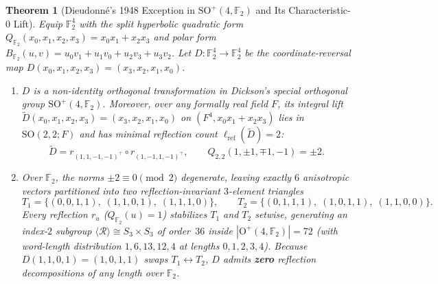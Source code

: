 \documentclass[11pt,a4paper]{article}
\theoremstyle{plain}
\newtheorem{theorem}{Theorem}[section]
\theoremstyle{definition}
\newcommand{\F}{\mathbb{F}}
\newcommand{\Orth}{\mathrm{O}}
\newcommand{\SO}{\mathrm{SO}}
\newcommand{\Refl}{\mathcal{R}}
\newcommand{\lref}{\ell_{\mathrm{ref}}}
\begin{document}
\begin{theorem}[Dieudonn\'e's 1948 Exception in $\SO^+(4, \F_2)$ and Its Characteristic-$0$ Lift]
\label{thm:dieudonne}
Equip $\F_2^4$ with the split hyperbolic quadratic form $Q_{\F_2}(x_0, x_1, x_2, x_3) = x_0 x_1 + x_2 x_3$ and polar form $B_{\F_2}(u, v) = u_0 v_1 + u_1 v_0 + u_2 v_3 + u_3 v_2$. Let $D : \F_2^4 \to \F_2^4$ be the coordinate-reversal map $D(x_0, x_1, x_2, x_3) = (x_3, x_2, x_1, x_0)$.
\begin{enumerate}
\item $D$ is a non-identity orthogonal transformation in Dickson's special orthogonal group $\SO^+(4, \F_2)$. Moreover, over any formally real field $F$, its integral lift $\widetilde{D}(x_0, x_1, x_2, x_3) = (x_3, x_2, x_1, x_0)$ on $(F^4, x_0 x_1 + x_2 x_3)$ lies in $\SO(2, 2; F)$ and has minimal reflection count $\lref(\widetilde{D}) = 2$:
\[
  \widetilde{D} = r_{(1, 1, -1, -1)^\top} \circ r_{(1, -1, 1, -1)^\top}, \qquad Q_{2,2}(1, \pm 1, \mp 1, -1) = \pm 2.
\]
\item Over $\F_2$, the norms $\pm 2 \equiv 0 \pmod{2}$ degenerate, leaving exactly $6$ anisotropic vectors partitioned into two reflection-invariant $3$-element triangles
\[
  T_1 = \bigl\{(0,0,1,1),\; (1,1,0,1),\; (1,1,1,0)\bigr\}, \qquad
  T_2 = \bigl\{(0,1,1,1),\; (1,0,1,1),\; (1,1,0,0)\bigr\}.
\]
Every reflection $r_u$ ($Q_{\F_2}(u) = 1$) stabilizes $T_1$ and $T_2$ setwise, generating an index-$2$ subgroup $\langle \Refl \rangle \cong S_3 \times S_3$ of order~$36$ inside $|\Orth^+(4, \F_2)| = 72$ (with word-length distribution $1, 6, 13, 12, 4$ at lengths $0, 1, 2, 3, 4$). Because $D(1,1,0,1) = (1,0,1,1)$ swaps $T_1 \leftrightarrow T_2$, $D$ admits \textbf{zero} reflection decompositions of any length over $\F_2$.
\end{enumerate}
\end{theorem}
\end{document}
